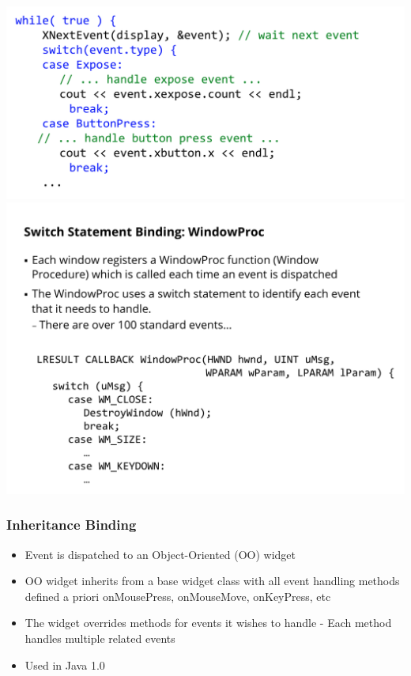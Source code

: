 \documentclass[twoside]{article}
\begin{document}
\begin{center}
\includegraphics[scale=0.2]{26}\\
\includegraphics[scale=0.25]{27}
\end{center}

\subsubsection{Inheritance Binding}
\begin{itemize}
\item Event is dispatched to an Object-Oriented (OO) widget
\item OO widget inherits from a base widget class with all event
handling methods defined a priori onMousePress, onMouseMove, onKeyPress, etc
\item The widget overrides methods for events it wishes to handle -  Each method handles multiple related events
\item Used in Java 1.0
\end{itemize}
\end{document}
